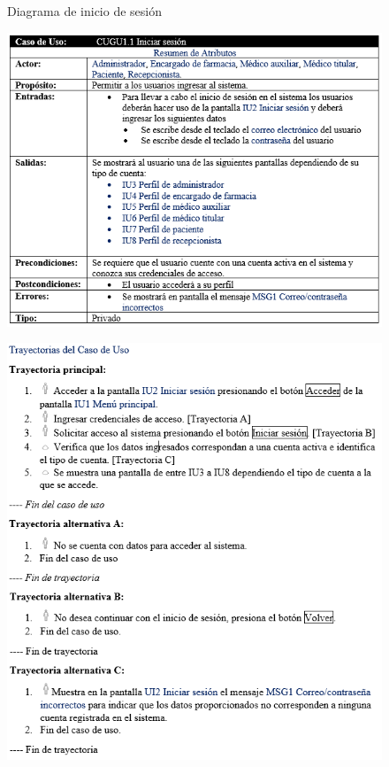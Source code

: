 \documentclass[12pt,letterpaper]{article}
\begin{document}
{\begin{figure}[H]
            \caption{Diagrama de inicio de sesión}
        \end{figure}
        \begin{figure}[H]
            \centering
            \includegraphics [scale=0.9]{especificacionInicio}
        \end{figure}
        \begin{figure}[H]
            \centering
            \includegraphics [scale=0.9]{trayectorias}

\end{figure}}
\end{document}
